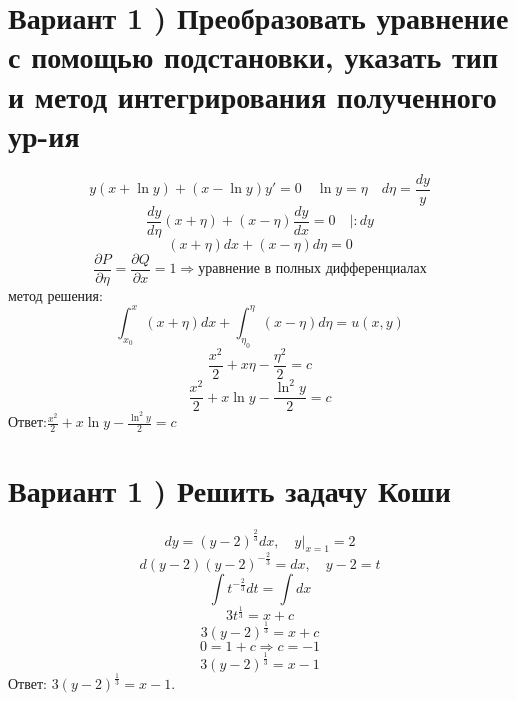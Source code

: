\documentclass[a4paper]{article}
\begin{document}
\section*{Вариант 1 ) Преобразовать уравнение с помощью подстановки, указать тип и метод интегрирования полученного ур-ия}
\begin{equation*}
y(x+\ln y)+(x-\ln y)y'=0 \quad \ln y = \eta \quad d\eta=\frac{dy}{y}
\end{equation*}
\begin{equation*}
\frac{dy}{d\eta}(x+\eta)+(x-\eta)\frac{dy}{dx}=0 \quad |:dy
\end{equation*}
\begin{equation*}
(x+\eta)dx+(x-\eta)d\eta=0
\end{equation*}
\begin{equation*}
\frac{\partial P}{\partial \eta}=\frac{\partial Q}{\partial x}=1 \Rightarrow \text{уравнение в полных дифференциалах}
\end{equation*}
метод решения:
\begin{equation*}
\int_{x_0}^{x}(x+\eta)dx+\int_{\eta_0}^{\eta}(x-\eta)d\eta=u(x,y)
\end{equation*}
\begin{equation*}
\frac{x^2}{2}+x\eta-\frac{\eta^2}{2}=c
\end{equation*}
\begin{equation*}
\frac{x^2}{2}+x\ln y-\frac{\ln^2{y}}{2}=c
\end{equation*}
Ответ:$\frac{x^2}{2}+x\ln y-\frac{\ln^2{y}}{2}=c$
\section*{Вариант 1 ) Решить задачу Коши}
\begin{equation*}
dy=(y-2)^{\frac{2}{3}}dx,\quad y|_{x=1}=2
\end{equation*}
\begin{equation*}
d(y-2)(y-2)^{-\frac{2}{3}}=dx, \quad y-2=t
\end{equation*}
\begin{equation*}
\int t^{-\frac{2}{3}}dt=\int dx
\end{equation*}
\begin{equation*}
3t^{\frac{1}{3}}=x+c
\end{equation*}
\begin{equation*}
3(y-2)^{\frac{1}{3}}=x+c
\end{equation*}
\begin{equation*}
0=1+c \Rightarrow c=-1
\end{equation*}
\begin{equation*}
3(y-2)^{\frac{1}{3}}=x-1
\end{equation*}
Ответ: $3(y-2)^{\frac{1}{3}}=x-1$.
\end{document}
